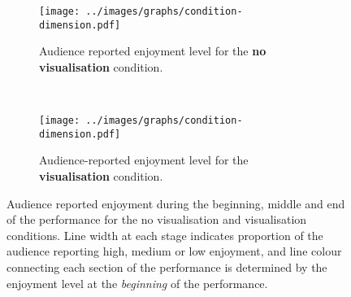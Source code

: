 \begin{figure}
\centering
\begin{subfigure}{\textwidth}
  \centering
  \texttt{[image: ../images/graphs/condition-dimension.pdf]}
  \caption[No visualisation condition enjoyment detailed survey results]{Audience reported enjoyment level for the \textbf{no visualisation} condition.}
  \label{fig:no-visualisation-enjoyment}
\end{subfigure}\\
\begin{subfigure}{\textwidth}
  \centering
  \texttt{[image: ../images/graphs/condition-dimension.pdf]}
  \caption[Visualisation condition enjoyment detailed survey results]{Audience-reported enjoyment level for the \textbf{visualisation} condition.}
  \label{fig:visualisation-enjoyment}
\end{subfigure}

\caption[Follow-up user study enjoyment survey responses]{Audience reported enjoyment during the beginning, middle and end of the performance for the no visualisation and visualisation conditions. Line width at each stage indicates proportion of the audience reporting high, medium or low enjoyment, and line colour connecting each section of the performance is determined by the enjoyment level at the \emph{beginning} of the performance.}
\label{fig:follow-up-user-study-condition-enjoyment}
\end{figure}